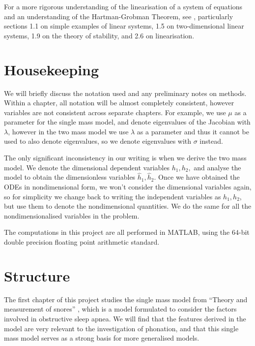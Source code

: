 \documentclass{report}
\begin{document}
For a more rigorous understanding of the linearisation of a system of equations and an understanding of the Hartman-Grobman Theorem,
see \cite{perko_textbook_1996},
particularly sections 1.1 on simple examples of linear systems,
1.5 on two-dimensional linear systems,
1.9 on the theory of stability,
and 2.6 on linearisation.

\section{Housekeeping}

We will briefly discuss the notation used and any preliminary notes on methods.
Within a chapter, all notation will be almost completely consistent,
however variables are not consistent across separate chapters.
For example, we use $\mu$ as a parameter for the single mass model,
and denote eigenvalues of the Jacobian with $\lambda$,
however in the two mass model we use $\lambda$ as a parameter and thus it cannot be used to also denote eigenvalues,
so we denote eigenvalues with $\sigma$ instead.

The only significant inconsistency in our writing is when we derive the two mass model.
We denote the dimensional dependent variables $h_1,h_2,$
and analyse the model to obtain the dimensionless variables $\hat{h}_1,\hat{h}_2.$
Once we have obtained the ODEs in nondimensional form,
we won't consider the dimensional variables again,
so for simplicity we change back to writing the independent variables as $h_1,h_2$,
but use them to denote the nondimensional quantities.
We do the same for all the nondimensionalised variables in the problem.

The computations in this project are all performed in MATLAB,
using the $64$-bit double precision floating point arithmetic standard.

\section{Structure}

The first chapter of this project studies the single mass model from ``Theory and measurement of snores'' \cite{gavriely_jensen_1993},
which is a model formulated to consider the factors involved in obstructive sleep apnea.
We will find that the features derived in the model are very relevant to the investigation of phonation,
and that this single mass model serves as a strong basis for more generalised models.
\end{document}

